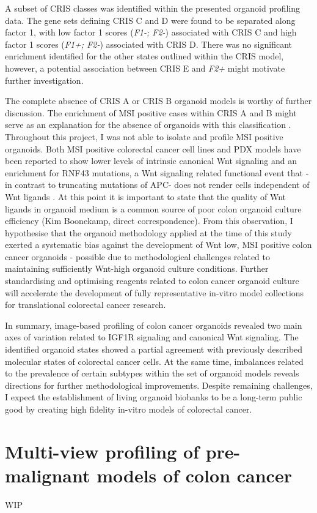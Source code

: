 \begin{flushleft}
A subset of CRIS classes was identified within the presented organoid profiling data. The gene sets defining CRIS C and D were found to be separated along factor 1, with low factor 1 scores (\textit{F1-; F2-}) associated with CRIS C and high factor 1 scores (\textit{F1+; F2-}) associated with CRIS D. There was no significant enrichment identified for the other states outlined within the CRIS model, however, a potential association between CRIS E and \textit{F2+} might motivate further investigation.

The complete absence of CRIS A or CRIS B organoid models is worthy of further discussion. The enrichment of MSI positive cases within CRIS A and B might serve as an explanation for the absence of organoids with this classification \citep{isellaSelectiveAnalysisCancercell2017a}. Throughout this project, I was not able to isolate and profile MSI positive organoids. Both MSI positive colorectal cancer cell lines \citep{imkellerMetabolicBalanceColorectal2022} and PDX models \citep{isellaSelectiveAnalysisCancercell2017a} have been reported to show lower levels of intrinsic canonical Wnt signaling and an enrichment for RNF43 mutations, a Wnt signaling related functional event that -in contrast to truncating mutations of APC- does not render cells independent of Wnt ligands \citep{vandeweteringProspectiveDerivationLiving2015}. At this point it is important to state that the quality of Wnt ligands in organoid medium is a common source of poor colon organoid culture efficiency (Kim Boonekamp, direct correspondence). From this observation, I hypothesise that the organoid methodology applied at the time of this study exerted a systematic bias against the development of Wnt low, MSI positive colon cancer organoids - possible due to methodological challenges related to maintaining sufficiently Wnt-high organoid culture conditions. Further standardising and optimising reagents related to colon cancer organoid culture will accelerate the development of fully representative in-vitro model collections for translational colorectal cancer research. 

In summary, image-based profiling of colon cancer organoids revealed two main axes of variation related to IGF1R signaling and canonical Wnt signaling. The identified organoid states showed a partial agreement with previously described molecular states of colorectal cancer cells. At the same time, imbalances related to the prevalence of certain subtypes within the set of organoid models reveals directions for further methodological improvements. Despite remaining challenges, I expect the establishment of living organoid biobanks to be a long-term public good by creating high fidelity in-vitro models of colorectal cancer. 

\section{Multi-view profiling of pre-malignant models of colon cancer}

WIP




\end{flushleft}